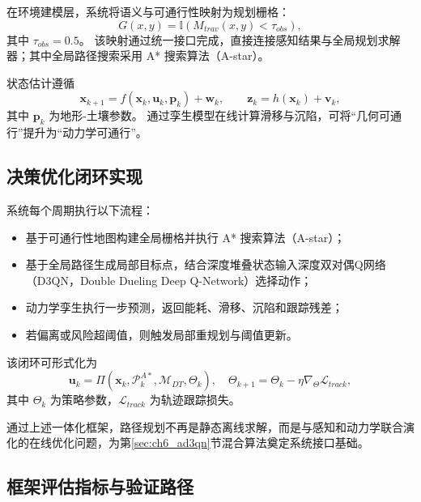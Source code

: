 \documentclass[UTF8,zihao=-4,a4paper,oneside,openany]{ctexrep}
\numberwithin{equation}{chapter}
\theoremstyle{plain}
\theoremstyle{definition}
\newenvironment{myitemize}{\begin{itemize}[noitemsep,topsep=0pt]}{\end{itemize}}
\begin{document}
在环境建模层，系统将语义与可通行性映射为规划栅格：
\begin{equation}
G(x,y)=\mathbb{I}\!\left(M_{trav}(x,y)<\tau_{obs}\right),
\label{eq:ch6_grid_from_trav}
\end{equation}
其中 $\tau_{obs}=0.5$。
该映射通过统一接口完成，直接连接感知结果与全局规划求解器；其中全局路径搜索采用 A* 搜索算法（A-star）\cite{hart1968astar}。

状态估计遵循
\begin{equation}
\mathbf{x}_{k+1}=f(\mathbf{x}_k,\mathbf{u}_k,\mathbf{p}_k)+\mathbf{w}_k,\qquad
\mathbf{z}_k=h(\mathbf{x}_k)+\mathbf{v}_k,
\label{eq:ch6_state_observe}
\end{equation}
其中 $\mathbf{p}_k$ 为地形-土壤参数。
通过孪生模型在线计算滑移与沉陷，可将“几何可通行”提升为“动力学可通行”。

\subsection{决策优化闭环实现}
\label{subsec:ch6_decision_loop}

系统每个周期执行以下流程：
\begin{myitemize}
	\item 基于可通行性地图构建全局栅格并执行 A* 搜索算法（A-star）\cite{hart1968astar}；
	\item 基于全局路径生成局部目标点，结合深度堆叠状态输入深度双对偶Q网络（D3QN，Double Dueling Deep Q-Network）选择动作\cite{mnih2015dqn,vanhasselt2016double}；
	\item 动力学孪生执行一步预测，返回能耗、滑移、沉陷和跟踪残差；
	\item 若偏离或风险超阈值，则触发局部重规划与阈值更新。
\end{myitemize}

该闭环可形式化为
\begin{equation}
\mathbf{u}_k=\Pi\!\left(\mathbf{x}_k,\mathcal{P}^{A*}_k,\mathcal{M}_{DT},\Theta_k\right),\quad
\Theta_{k+1}=\Theta_k-\eta\nabla_{\Theta}\mathcal{L}_{track},
\label{eq:ch6_closed_loop}
\end{equation}
其中 $\Theta_k$ 为策略参数，$\mathcal{L}_{track}$ 为轨迹跟踪损失。

通过上述一体化框架，路径规划不再是静态离线求解，而是与感知和动力学联合演化的在线优化问题，为第\ref{sec:ch6_ad3qn}节混合算法奠定系统接口基础。

\subsection{框架评估指标与验证路径}
\label{subsec:ch6_framework_eval}
\end{document}
